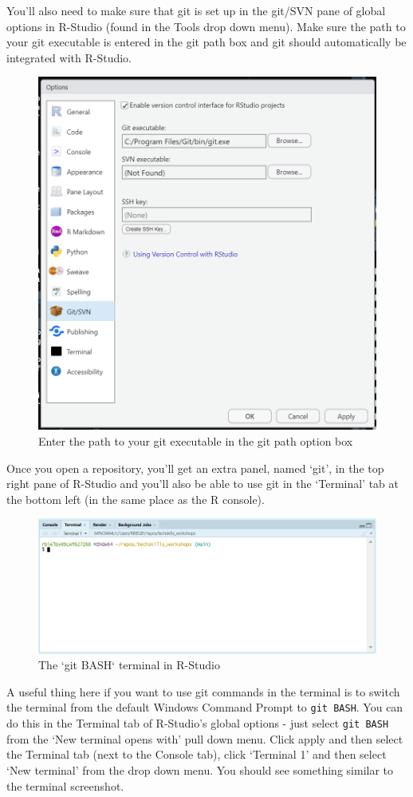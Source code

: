 \documentclass[
  12pt,
]{article}
\begin{document}
You'll also need to make sure that git is set up in the git/SVN pane of
global options in R-Studio (found in the Tools drop down menu). Make
sure the path to your git executable is entered in the git path box and
git should automatically be integrated with R-Studio.

\begin{figure}
\includegraphics[width=0.64\linewidth]{images/gitdemo/gitdemo-gitRstudio-settings} \caption{Enter the path to your git executable in the git path option box}\label{fig:unnamed-chunk-1}
\end{figure}

Once you open a repository, you'll get an extra panel, named `git', in
the top right pane of R-Studio and you'll also be able to use git in the
`Terminal' tab at the bottom left (in the same place as the R console).

\begin{figure}
\includegraphics[width=0.56\linewidth]{images/gitdemo/gitdemo-gitRstudio-NewTerminal} \caption{The `git BASH` terminal in R-Studio}\label{fig:unnamed-chunk-2}
\end{figure}

A useful thing here if you want to use git commands in the terminal is
to switch the terminal from the default Windows Command Prompt to
\texttt{git\ BASH}. You can do this in the Terminal tab of R-Studio's
global options - just select \texttt{git\ BASH} from the `New terminal
opens with' pull down menu. Click apply and then select the Terminal tab
(next to the Console tab), click `Terminal 1' and then select `New
terminal' from the drop down menu. You should see something similar to
the terminal screenshot.
\end{document}
